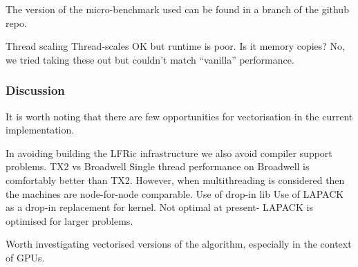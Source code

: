 The version of the micro-benchmark used can be found in a branch of the github repo.

Thread scaling
Thread-scales OK but runtime is poor.
Is it memory copies? No, we tried taking these out but couldn't match ``vanilla'' performance.

\subsubsection{Discussion}

It is worth noting that there are few opportunities for vectorisation in the current implementation.

In avoiding building the LFRic infrastructure we also avoid compiler support problems.
TX2 vs Broadwell
Single thread performance on Broadwell is comfortably better than TX2. However, when multithreading is considered then the machines are node-for-node comparable.
Use of drop-in lib
Use of LAPACK as a drop-in replacement for kernel. Not optimal at present- LAPACK is optimised for larger problems.

Worth investigating vectorised versions of the algorithm, especially in the context of GPUs.
